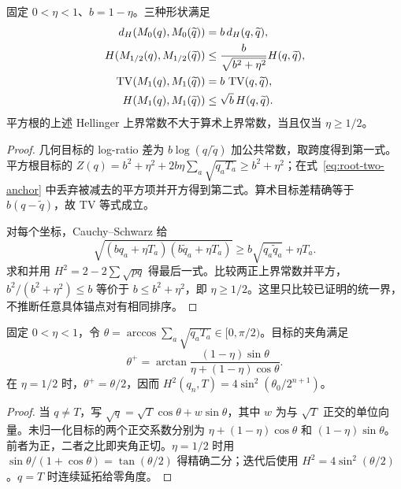 \begin{proposition}[插值区间的扰动收缩比较]
\label{prop:interpolation-stability}
固定 $0<\eta<1$、$b=1-\eta$。三种形状满足
\begin{align}
d_H(M_0(q),M_0(\widetilde q))&=b\,d_H(q,\widetilde q),\\
H(M_{1/2}(q),M_{1/2}(\widetilde q))&\le\frac b{\sqrt{b^2+\eta^2}}H(q,\widetilde q),\\
\operatorname{TV}(M_1(q),M_1(\widetilde q))&=b\,\operatorname{TV}(q,\widetilde q),\\
H(M_1(q),M_1(\widetilde q))&\le\sqrt b\,H(q,\widetilde q).
\end{align}
平方根的上述 Hellinger 上界常数不大于算术上界常数，当且仅当 $\eta\ge1/2$。
\end{proposition}
\begin{proof}
几何目标的 log-ratio 差为 $b\log(q/\widetilde q)$ 加公共常数，取跨度得到第一式。平方根目标的 $Z(q)=b^2+\eta^2+2b\eta\sum_a\sqrt{q_aT_a}\ge b^2+\eta^2$；在式~\eqref{eq:root-two-anchor} 中丢弃被减去的平方项并开方得到第二式。算术目标差精确等于 $b(q-\widetilde q)$，故 TV 等式成立。

对每个坐标，Cauchy--Schwarz 给
\begin{equation}
\sqrt{(bq_a+\eta T_a)(b\widetilde q_a+\eta T_a)}
\ge b\sqrt{q_a\widetilde q_a}+\eta T_a.
\end{equation}
求和并用 $H^2=2-2\sum\sqrt{pq}$ 得最后一式。比较两正上界常数并平方，$b^2/(b^2+\eta^2)\le b$ 等价于 $b\le b^2+\eta^2$，即 $\eta\ge1/2$。这里只比较已证明的统一界，不推断任意具体锚点对有相同排序。
\end{proof}

\begin{proposition}[平方根插值的角度递推]
\label{prop:root-interpolation-angle}
固定 $0<\eta<1$，令 $\theta=\arccos\sum_a\sqrt{q_aT_a}\in[0,\pi/2)$。目标的夹角满足
\begin{equation}
\theta^+=\arctan\frac{(1-\eta)\sin\theta}{\eta+(1-\eta)\cos\theta}.
\end{equation}
在 $\eta=1/2$ 时，$\theta^+=\theta/2$，因而 $H^2(q_n,T)=4\sin^2(\theta_0/2^{n+1})$。
\end{proposition}
\begin{proof}
当 $q\ne T$，写 $\sqrt q=\sqrt T\cos\theta+w\sin\theta$，其中 $w$ 为与 $\sqrt T$ 正交的单位向量。未归一化目标的两个正交系数分别为 $\eta+(1-\eta)\cos\theta$ 和 $(1-\eta)\sin\theta$。前者为正，二者之比即夹角正切。$\eta=1/2$ 时用 $\sin\theta/(1+\cos\theta)=\tan(\theta/2)$ 得精确二分；迭代后使用 $H^2=4\sin^2(\theta/2)$。$q=T$ 时连续延拓给零角度。
\end{proof}

